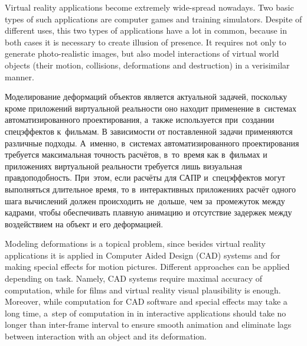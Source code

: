 \documentclass[a4paper, 12pt, titlepage]{extarticle}
\begin{document}
    Virtual reality applications become extremely wide-spread nowadays. Two basic types of such
    applications are computer games and training simulators. Despite of different uses, this two
    types of applications have a lot in common, because in both cases it is necessary to create
    illusion of presence. It requires not only to generate photo-realistic images, but also model
    interactions of virtual world objects (their motion, collisions, deformations and destruction)
    in a verisimilar manner.

\begin{original}
    Моделирование деформаций объектов является актуальной задачей, поскольку кроме приложений
    виртуальной реальности оно находит применение в~системах автоматизированного проектирования, а~также используется
    при~создании спецэффектов к~фильмам. В зависимости от поставленной задачи применяются различные
    подходы. А~именно, в~системах автоматизированного проектирования требуется
    максимальная точность расчётов, в~то~время как в~фильмах и приложениях виртуальной реальности
    требуется лишь визуальная правдоподобность. При~этом, если расчёты для САПР и~спецэффектов могут
    выполняться длительное время, то в~интерактивных приложениях расчёт одного шага вычислений должен
    происходить не~дольше, чем за~промежуток между кадрами, чтобы обеспечивать плавную анимацию
    и отсутствие задержек между воздействием на объект и его деформацией.
\end{original}

    Modeling deformations is a topical problem, since besides virtual reality applications it is
    applied in Computer Aided Design (CAD) systems and for making special effects for motion
    pictures.  Different approaches can be applied depending on task. Namely, CAD systems require
    maximal accuracy of computation, while for films and virtual reality visual plausibility is
    enough. Moreover, while %
    computation for CAD software and special effects may take a long time, a~step of computation in in interactive
    applications should take no longer than inter-frame interval to ensure smooth animation and
    eliminate lags between interaction with an object and its deformation.
\end{document}

